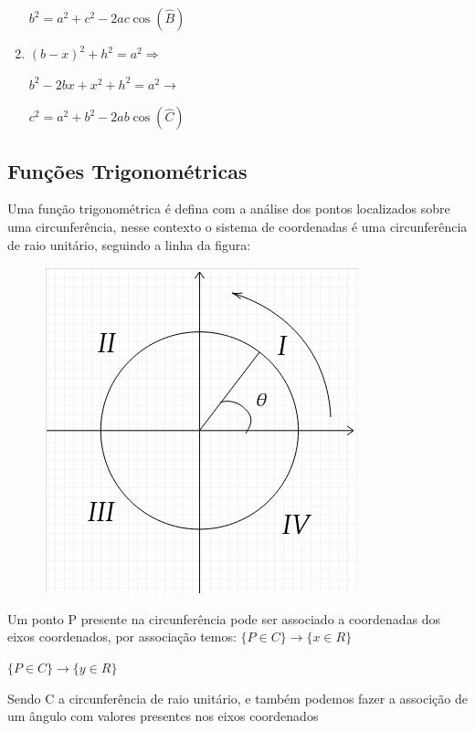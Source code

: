 \begin{multicols*}{2}
\begin{enumerate}
        $b^2 = a^2 + c^2 - 2ac \cos (\widehat{B})$
        
        \item $(b - x)^2 + h^2 = a^2 \Rightarrow$
        
        $b^2 -2bx + x^2 + h^2 = a^2 \rightarrow$
        
        $ c^2 = a^2 + b^2 - 2ab \cos(\widehat{C}) $
        \end{enumerate}
    
    
    \subsection*{Funções Trigonométricas}
    
    Uma função trigonométrica é defina com a análise dos pontos localizados sobre uma circunferência, nesse contexto o sistema de coordenadas é uma circunferência de raio unitário, seguindo a linha da figura:
    
    \begin{figure}[H]
        
        \includegraphics[scale=0.5]{assets/rafael/img31.png}
    \end{figure}
    
    Um ponto P presente na circunferência pode ser associado a coordenadas dos eixos coordenados, por associação temos:
    $\{ P \in C\} \rightarrow \{x \in R\}$
    
    $\{ P \in C\} \rightarrow \{y \in R\}$
    
    Sendo C a circunferência de raio unitário, e também podemos fazer a associção de um ângulo com valores presentes nos eixos coordenados
    

\end{multicols*}
